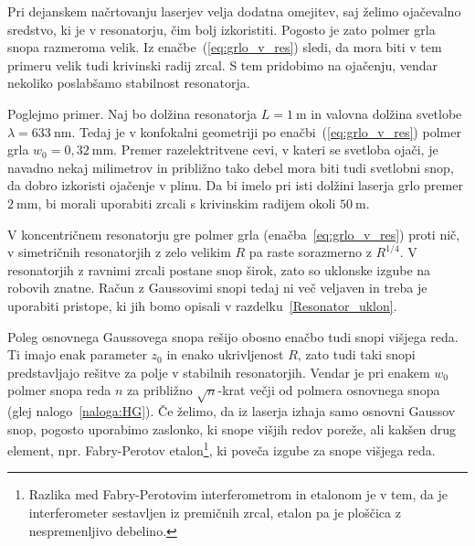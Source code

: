Pri dejanskem načrtovanju laserjev velja dodatna omejitev, saj želimo 
ojačevalno sredstvo, ki je v resonatorju, čim bolj izkoristiti. Pogosto je zato 
polmer grla snopa razmeroma velik. Iz enačbe~(\ref{eq:grlo_v_res})
sledi, da mora biti v tem primeru velik tudi krivinski radij zrcal. S tem
pridobimo na ojačenju, vendar nekoliko poslabšamo stabilnost resonatorja.

Poglejmo primer. Naj bo dolžina resonatorja $L=1~\si{\metre}$ in valovna
dolžina svetlobe $\lambda = 633~\si{\nano\metre}$. Tedaj je v konfokalni geometriji po enačbi~(\ref{eq:grlo_v_res})
polmer grla $w_{0}=0,32~\si{\milli\metre}$. Premer razelektritvene cevi, v kateri se 
svetloba ojači, je navadno
nekaj milimetrov in približno tako debel mora biti tudi svetlobni
snop, da dobro izkoristi ojačenje v plinu.
Da bi imelo pri isti dolžini laserja grlo premer $2~\si{\milli\metre}$, bi morali
uporabiti zrcali s krivinskim radijem okoli $50~\si{\metre}$. 

V koncentričnem resonatorju gre polmer grla (enačba~\ref{eq:grlo_v_res}) proti nič, v
simetričnih resonatorjih z zelo velikim $R$ pa 
raste sorazmerno z $R^{1/4}$. V resonatorjih z ravnimi zrcali 
postane snop širok, zato so uklonske izgube na robovih znatne. 
Račun z Gaussovimi snopi tedaj ni več veljaven
in treba je uporabiti pristope, ki jih bomo opisali
v razdelku~\ref{Resonator_uklon}.

Poleg osnovnega Gaussovega snopa rešijo obosno enačbo tudi snopi višjega reda. 
Ti imajo enak parameter $z_{0}$ in enako ukrivljenost $R$, zato tudi taki snopi 
predstavljajo rešitve za polje v stabilnih resonatorjih. Vendar je pri enakem $w_{0}$
polmer snopa reda $n$ za približno $\sqrt{n}$-krat večji od polmera osnovnega snopa
(glej nalogo~\ref{naloga:HG}). Če želimo, da iz laserja izhaja samo 
osnovni Gaussov snop, 
pogosto uporabimo zaslonko, ki snope višjih redov poreže, 
ali kakšen drug element, npr. Fabry-Perotov etalon\footnote{Razlika med Fabry-Perotovim
interferometrom in etalonom je v tem, da je interferometer sestavljen iz premičnih 
zrcal, etalon pa je ploščica z nespremenljivo debelino.}, ki poveča izgube za snope višjega reda.

